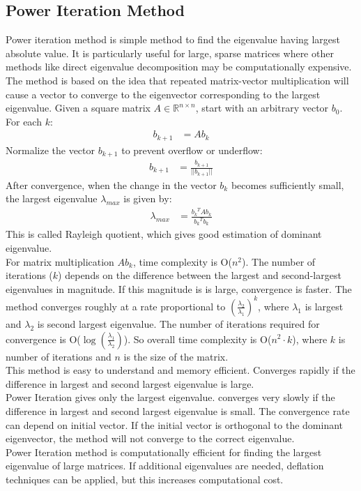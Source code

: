 \documentclass{article}
\begin{document}
\subsection*{Power Iteration Method}
Power iteration method is simple method to find the eigenvalue having largest absolute value. It is particularly useful for large, sparse matrices where other methods like direct eigenvalue decomposition may be computationally expensive. 
\\The method is based on the idea that repeated matrix-vector multiplication will cause a vector to converge to the eigenvector corresponding to the largest eigenvalue.
Given a square matrix $A \in {\mathbb{R}^{n{\times}n}}$, start with an arbitrary vector $b_0$. For each $k$:
\begin{align*}
    b_{k+1}&=Ab_k
\end{align*}
Normalize the vector $b_{k+1}$ to prevent overflow or underflow:
\begin{align*}
    b_{k+1}&=\frac{b_{k+1}}{||b_{k+1}||}
\end{align*}
After convergence, when the change in the vector $b_k$ becomes sufficiently small, the largest eigenvalue $\lambda_{max}$ is given by:
\begin{align*}
    \lambda_{max}&=\frac{{b_k}^TAb_k}{{b_k}^Tb_k}
\end{align*}
This is called Rayleigh quotient, which gives good estimation of dominant eigenvalue.
\\For matrix multiplication $Ab_k$, time complexity is O($n^2$). The number of iterations ($k$) depends on the difference between the largest and second-largest eigenvalues in magnitude. If this magnitude is is large, convergence is faster. The method converges roughly at a rate proportional to $(\frac{\lambda_2}{\lambda_1})^k$, where $\lambda_1$ is largest and $\lambda_2$ is second largest eigenvalue. The number of iterations required for convergence is O($\log(\frac{\lambda_1}{\lambda_2})$). So overall time complexity is O($n^2{\cdot}k$), where $k$ is number of iterations and $n$ is the size of the matrix.
\\This method is easy to understand and memory efficient. Converges rapidly if the difference in largest and second largest eigenvalue is large.
\\Power Iteration gives only the largest eigenvalue. converges very slowly if the difference in largest and second largest eigenvalue is small. The convergence rate can depend on initial vector. If the initial vector is orthogonal to the dominant eigenvector, the method will not converge to the correct eigenvalue.
\\ Power Iteration method is computationally efficient for finding the largest eigenvalue of large matrices. If additional eigenvalues are needed, deflation techniques can be applied, but this increases computational cost.
\end{document}
